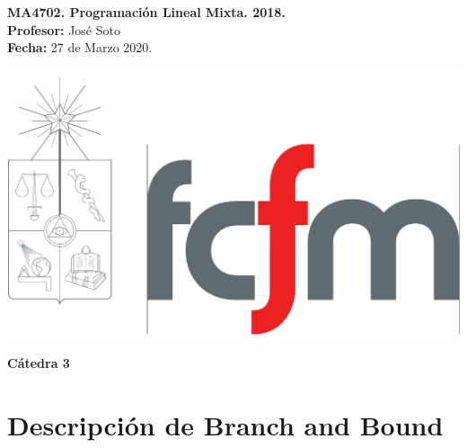 
\newcommand{\sca}{Escriba Uno}
\newcommand{\scb}{Escriba Dos}
\newcommand{\scc}{Escriba Tres}
\newcommand{\catnum}{3} %
\newcommand{\fecha}{27 de Marzo 2020}



\shorthandoff{>}\shorthandoff{<}
\vspace*{-1.2 cm}
\begin{minipage}{0.6\textwidth}
\begin{flushleft}
\hspace*{-0.5cm}\textbf{MA4702. Programación Lineal Mixta. 2018.}\\
\hspace*{-0.5cm}\textbf{Profesor:} José Soto\\
\hspace*{-0.5cm}\textbf{Fecha:} \fecha.
\end{flushleft}
\end{minipage}
\begin{minipage}{0.36\textwidth}
\begin{flushright}
\includegraphics[scale=0.15]{fcfm}
\end{flushright}
\end{minipage}
\bigskip

\begin{center}
\LARGE\textbf{Cátedra \catnum}
\end{center}

\section{Descripción de Branch and Bound}

